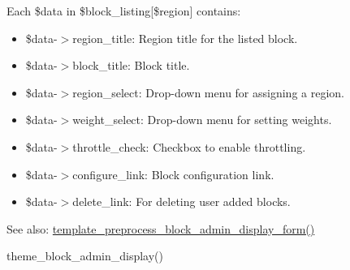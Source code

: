 Each \$data in \$block\_\-listing\mbox{[}\$region\mbox{]} contains:\begin{itemize}
\item \$data-$>$region\_\-title: Region title for the listed block.\item \$data-$>$block\_\-title: Block title.\item \$data-$>$region\_\-select: Drop-down menu for assigning a region.\item \$data-$>$weight\_\-select: Drop-down menu for setting weights.\item \$data-$>$throttle\_\-check: Checkbox to enable throttling.\item \$data-$>$configure\_\-link: Block configuration link.\item \$data-$>$delete\_\-link: For deleting user added blocks.\end{itemize}


\begin{Desc}
\item[See also:]\hyperlink{block_8admin_8inc_790da1d1c8cea6bceca5374a4e410c01}{template\_\-preprocess\_\-block\_\-admin\_\-display\_\-form()} 

theme\_\-block\_\-admin\_\-display() \end{Desc}
